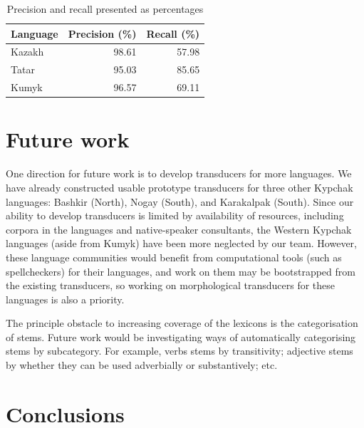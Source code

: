 \documentclass[a4paper,11pt,twocolumn]{article}
\begin{document}

\begin{table}
\begin{center}
	\begin{tabular}{lrr}
	\toprule
		\textbf{Language} & \textbf{Precision (\%)} & \textbf{Recall (\%)} \\
	\midrule
		Kazakh & 98.61 &  57.98 \\
		Tatar & 95.03 & 85.65 \\
		Kumyk & 96.57 & 69.11 \\
	\bottomrule
	\end{tabular}
	\caption{Precision and recall presented as percentages}
	\label{table:precrecall}
\end{center}
\end{table}


\section{Future work}


One direction for future work is to develop transducers for more languages.  We have already constructed usable prototype transducers for three other Kypchak languages: Bashkir (North), Nogay (South), and Karakalpak (South).  Since our ability to develop transducers is limited by availability of resources, including corpora in the languages and native-speaker consultants, the Western Kypchak languages (aside from Kumyk) have been more neglected by our team.  However, these language communities would benefit from computational tools (such as spellcheckers) for their languages, and work on them may be bootstrapped from the existing transducers, so working on morphological transducers for these languages is also a priority.

The principle obstacle to increasing coverage of the lexicons is the categorisation of stems. Future work would be investigating ways of automatically categorising stems by subcategory. For example, verbs stems by transitivity; adjective stems by whether  they can be used adverbially or substantively; etc. 

\section{Conclusions}\label{sec:conclusions}
\end{document}
